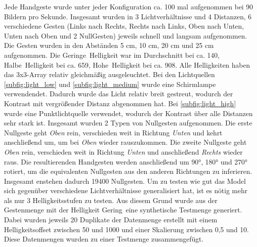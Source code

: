 Jede Handgeste wurde unter jeder Konfiguration ca. 100 mal aufgenommen bei 90 Bildern pro Sekunde. Insgesamt wurden in 3 Lichtverhältnisse und 4 Distanzen, 6 verschiedene Gesten (Links nach Rechts,
Rechts nach Links, Oben nach Unten, Unten nach Oben und 2 NullGesten) jeweils schnell und langsam aufgenommen. Die Gesten wurden in den Abständen 5 cm, 10 cm, 20 cm und 25 cm aufgenommen.
\newline
\newline
Die \glqq Geringe\grqq\ Helligkeit war im Durchschnitt bei ca. 140, \glqq Halbe\grqq\ Helligkeit bei ca. 659, \glqq Hohe\grqq\ Helligkeit bei ca. 908. Alle Helligkeiten haben das 3x3-Array
relativ gleichmäßig ausgeleuchtet. Bei den Lichtquellen \ref{subfig:light_low} und \ref{subfig:light_medium} wurde eine Schirmlampe verwendendet. Dadurch wurde das Licht relativ breit gestreut,
wodurch der Kontrast mit vergrößender Distanz abgenommen hat. Bei \ref{subfig:light_high} wurde eine Punktlichtquelle verwendet, wodurch der Kontrast über alle Distanzen sehr stark ist.
\newline
\newline
Insgesamt wurden 2 Typen von Nullgesten aufgenommen. Die erste Nullgeste geht \textit{Oben} rein, verschieden weit in Richtung \textit{Unten} und kehrt anschließend um, um bei \textit{Oben} wieder rauszukommen.
Die zweite Nullgeste geht \textit{Oben} rein, verschieden weit in Richtung \textit{Unten} und anschließend \textit{Rechts} wieder raus.
\newline
\newline
Die resultierenden Handgesten werden anschließend um 90°, 180° und 270° rotiert, um die equivalenten Nullgesten aus den anderen Richtungen zu inferieren. Insgesamt enstehen dadurch 19400 Nullgesten.
\newline
\newline
Um zu testen wie gut das Model sich gegenüber verschiedene Lichtverhältnisse generalisiert hat, ist es nötig mehr als nur 3 Helligkeitsstufen zu testen. Aus diesem Grund wurde aus der Gestenmenge mit
der Helligkeit \glqq Gering\grqq\ eine synthetische Testmenge generiert.
\newline
\newline
Dabei wurden jeweils 20 Duplikate der Datenmenge erstellt mit einem Helligkeitsoffset zwischen 50 und 1000 und einer Skalierung zwischen 0,5 und 10. Diese Datenmengen wurden zu einer Testmenge zusammengefügt.